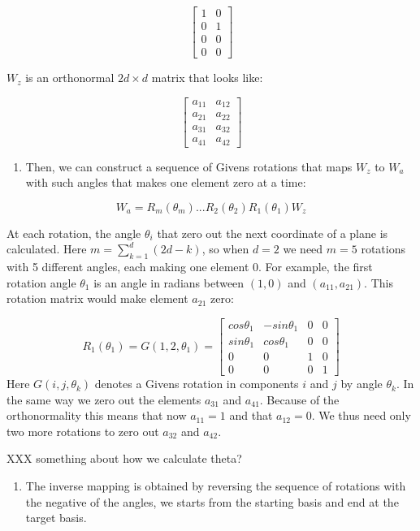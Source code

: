 \[ \begin{bmatrix}1 & 0 \\0  &1 \\ 0&0 \\0&0\end{bmatrix} \]

\(W_z\) is an orthonormal \(2d\times d\) matrix that looks like:

\[ \begin{bmatrix} a_{11} & a_{12} \\a_{21}  &a_{22} \\ a_{31}&a_{32} \\a_{41}&a_{42}\end{bmatrix} \]

\begin{enumerate}
\def\labelenumi{\arabic{enumi}.}
\setcounter{enumi}{2}
\tightlist
\item
  Then, we can construct a sequence of Givens rotations that maps
  \(W_z\) to \(W_a\) with such angles that makes one element zero at a
  time:
\end{enumerate}

\[ W_a = R_m(\theta_m) ... R_2(\theta_2)R_1(\theta_1)W_z\]

At each rotation, the angle \(\theta_i\) that zero out the next
coordinate of a plane is calculated. Here \(m = \sum_{k=1}^d (2d - k)\),
so when \(d=2\) we need \(m=5\) rotations with 5 different angles, each
making one element 0. For example, the first rotation angle \(\theta_1\)
is an angle in radians between \((1, 0)\) and \((a_{11}, a_{21})\). This
rotation matrix would make element \(a_{21}\) zero:

\[R_1(\theta_1) = G(1, 2, \theta_1) = \begin{bmatrix} cos\theta_1 & -sin\theta_1 & 0 & 0 \\sin\theta_1  &cos\theta_1 & 0 &0 \\ 0&0&1&0 \\0&0&0&1\end{bmatrix}\]
Here \(G(i,j,\theta_k)\) denotes a Givens rotation in components \(i\)
and \(j\) by angle \(\theta_k\). In the same way we zero out the
elements \(a_{31}\) and \(a_{41}\). Because of the orthonormality this
means that now \(a_{11} = 1\) and that \(a_{12} = 0\). We thus need only
two more rotations to zero out \(a_{32}\) and \(a_{42}\).

XXX something about how we calculate theta?

\begin{enumerate}
\def\labelenumi{\arabic{enumi}.}
\setcounter{enumi}{3}
\tightlist
\item
  The inverse mapping is obtained by reversing the sequence of rotations
  with the negative of the angles, we starts from the starting basis and
  end at the target basis.
\end{enumerate}

